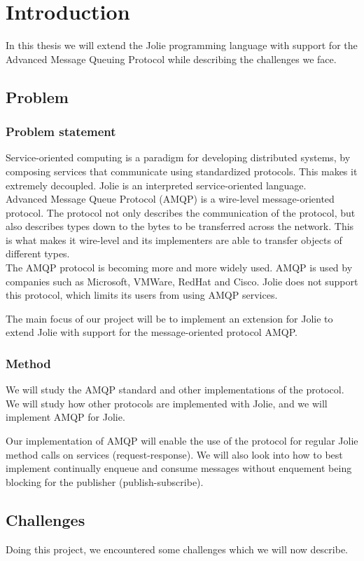 \section{Introduction}
In this thesis we will extend the Jolie programming language with support for the Advanced Message Queuing Protocol while describing the challenges we face.
\subsection{Problem}
\subsubsection{Problem statement}
Service-oriented computing is a paradigm for developing distributed systems, by composing services that communicate using standardized protocols. This makes it extremely decoupled. Jolie is an interpreted service-oriented language.\\
Advanced Message Queue Protocol (AMQP) is a wire-level message-oriented protocol. The protocol not only describes the communication of the protocol, but also describes types down to the bytes to be transferred across the network. This is what makes it wire-level and its implementers are able to transfer objects of different types.\\
The AMQP protocol is becoming more and more widely used. AMQP is used by companies such as Microsoft, VMWare, RedHat and Cisco. Jolie does not support this protocol, which limits its users from using AMQP services.

The main focus of our project will be to implement an extension for Jolie to extend Jolie with support for the message-oriented protocol AMQP.
\subsubsection{Method}
We will study the AMQP standard and other implementations of the protocol. We will study how other protocols are implemented with Jolie, and we will implement AMQP for Jolie.

Our implementation of AMQP will enable the use of the protocol for regular Jolie method calls on services (request-response). We will also look into how to best implement continually enqueue and consume messages without enquement being blocking for the publisher (publish-subscribe).

\subsection{Challenges}
Doing this project, we encountered some challenges which we will now describe.
